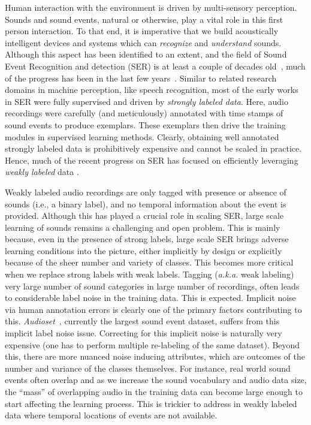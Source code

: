 \documentclass{article}
\begin{document}
Human interaction with the environment is driven by multi-sensory perception. 
Sounds and sound events, natural or otherwise, play a vital role in this first person interaction. 
To that end, it is  imperative that we build acoustically intelligent devices and systems which can {\it recognize } and {\it understand} sounds. 
Although this aspect has been identified to an extent, 
and the field of Sound Event Recognition and detection (SER) is at least a couple of decades old~\cite{xiong2003audio,atrey2006audio}, 
much of the progress has been in the last few years~\cite{virtanen2018computational}. 
Similar to related research domains in machine perception, like speech recognition, 
most of the early works in SER were fully supervised and driven by \emph{strongly labeled data}. 
Here, audio recordings were carefully (and meticulously) annotated with time stamps of sound events to produce exemplars.
These exemplars then drive the training modules in supervised learning methods. 
Clearly, obtaining well annotated strongly labeled data is prohibitively expensive and cannot be scaled in practice. 
Hence, much of the recent progress on SER has focused on efficiently leveraging \emph{weakly labeled} data \cite{kumar2016audio}. 

Weakly labeled audio recordings are only tagged with presence or absence of sounds (i.e.,  a binary label), 
and no temporal information about the event is provided. 
Although this has played a crucial role in scaling SER, 
large scale learning of sounds remains a challenging and open problem. 
This is mainly because, even in the presence of strong labels, large scale SER brings adverse learning conditions into the picture, 
either implicitly by design or explicitly because of the sheer number and variety of classes. 
This becomes more critical when we replace strong labels with weak labels.  
Tagging ({\it a.k.a.} weak labeling) very large number of sound categories in large number of recordings, 
often leads to considerable label noise in the training data. This is expected. 
Implicit noise via human annotation errors is clearly one of the primary factors contributing to this.
\emph{Audioset}~\cite{gemmeke2017audio}, currently the largest sound event dataset, suffers from this implicit label noise issue.
Correcting for this implicit noise is naturally very expensive (one has to perform multiple re-labeling of the same dataset). 
Beyond this, there are more nuanced noise inducing attributes, which are outcomes of the number and variance of the classes themselves. 
For instance, real world sound events often overlap and as we increase the sound vocabulary and audio data size, 
the ``mass'' of overlapping audio in the training data can become large enough to start affecting the learning process. 
This is trickier to address in weakly labeled data where temporal locations of events are not available. 
\end{document}
